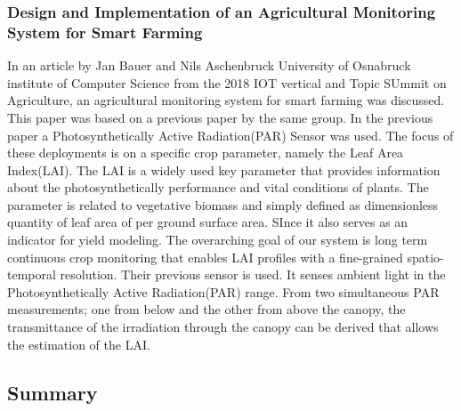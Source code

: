\documentclass[12pt, a4paper]{article}
\begin{document}
\subsubsection{Design and Implementation of an Agricultural Monitoring System for Smart Farming}
In an article by Jan Bauer and Nils Aschenbruck University of Osnabruck institute of Computer Science from the 2018 IOT vertical and Topic SUmmit on Agriculture, an agricultural monitoring system for smart farming was discussed.\\
This paper was based on a previous paper by the same group. In the previous paper a Photosynthetically Active Radiation(PAR) Sensor was used. The focus of these deployments is on a specific crop parameter, namely the Leaf Area Index(LAI). The LAI is a widely used key parameter that provides information about the photosynthetically performance and vital conditions of plants. The parameter is related to vegetative biomass and simply defined as dimensionless quantity of leaf area of per ground surface area. SInce it also serves as an indicator for yield modeling. The overarching goal of our system is long term continuous crop monitoring that enables LAI profiles with a fine-grained  spatio-temporal resolution. Their previous sensor is used. It senses ambient light in the Photosynthetically Active Radiation(PAR) range. From two simultaneous  PAR measurements; one from below and the other from above the canopy, the transmittance of the irradiation through the canopy can be derived that allows the estimation of the LAI. 
\subsection{Summary}
\end{document}
